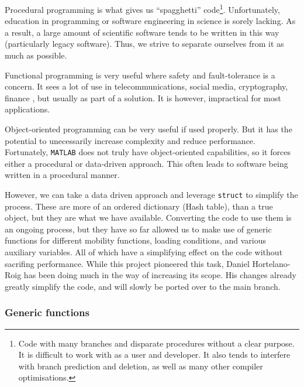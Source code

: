 Procedural programming is what gives us ``spagghetti'' code\footnote{Code with many branches and disparate procedures without a clear purpose. It is difficult to work with as a user and developer. It also tends to interfere with branch prediction and deletion, as well as many other compiler optimisations.}. Unfortunately, education in programming or software engineering in science is sorely lacking. As a result, a large amount of scientific software tends to be written in this way (particularly legacy software). Thus, we strive to separate ourselves from it as much as possible.

Functional programming is very useful where safety and fault-tolerance is a concern. It sees a lot of use in telecommunications, social media, cryptography, finance \cite{haskell,functionalProg}, but usually as part of a solution. It is however, impractical for most applications.

Object-oriented programming can be very useful if used properly. But it has the potential to unecessarily increase complexity and reduce performance. Fortunately, \texttt{MATLAB} does not truly have object-oriented capabilities, so it forces either a procedural or data-driven approach. This often leads to software being written in a procedural manner.

However, we can take a data driven approach and leverage \texttt{struct} to simplify the process. These are more of an ordered dictionary (Hash table), than a true object, but they are what we have available. Converting the code to use them is an ongoing process, but they have so far allowed us to make use of generic functions for different mobility functions, loading conditions, and various auxiliary variables. All of which have a simplifying effect on the code without sacrifing performance. While this project pioneered this task, Daniel Hortelano-Roig has been doing much in the way of increasing its scope. His changes already greatly simplify the code, and will slowly be ported over to the main branch.

\subsubsection{Generic functions}

